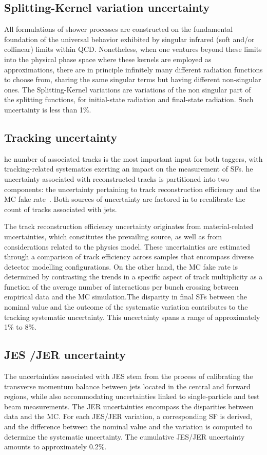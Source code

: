 \subsection{Splitting-Kernel variation uncertainty}
All formulations of shower processes are constructed on the fundamental foundation of the universal behavior exhibited by singular infrared (soft and/or collinear) limits within QCD. Nonetheless, when one ventures beyond these limits into the physical phase space where these kernels are employed as approximations, there are in principle infinitely many different radiation functions to choose from, sharing the same singular terms but having different non-singular ones.  The Splitting-Kernel variations are variations of the non singular part of the splitting functions, for initial-state radiation and final-state radiation. Such uncertainty is less than 1\%.
  
    \subsection{Tracking uncertainty}

he number of associated tracks is the most important input for both taggers, with tracking-related systematics exerting an impact on the measurement of SFs. he uncertainty associated with reconstructed tracks is partitioned into two components: the uncertainty pertaining to track reconstruction efficiency and the MC fake rate~\cite{ATLAS:2017kyn}. Both sources of uncertainty are factored in to recalibrate the count of tracks associated with jets.

 The track reconstruction efficiency uncertainty originates from material-related uncertainties, which constitutes the prevailing source, as well as from considerations related to the physics model. These uncertainties are estimated through a comparison of track efficiency across samples that encompass diverse detector modelling configurations. On the other hand, the MC fake rate is determined by contrasting the trends in a specific aspect of track multiplicity as a function of the average number of interactions per bunch crossing between empirical data and the MC simulation.The disparity in final SFs between the nominal value and the outcome of the systematic variation contributes to the tracking systematic uncertainty. This uncertainty spans a range of approximately 1\% to 8\%.

  \subsection{JES /JER uncertainty }
The uncertainties associated with JES stem from the process of calibrating the transverse momentum balance between jets located in the central and forward regions, while also accommodating uncertainties linked to single-particle and test beam measurements. The JER uncertainties encompass the disparities between data and the MC. For each JES/JER variation, a corresponding SF is derived, and the difference between the nominal value and the variation is computed to determine the systematic uncertainty. The cumulative JES/JER uncertainty amounts to approximately 0.2\%.
  
